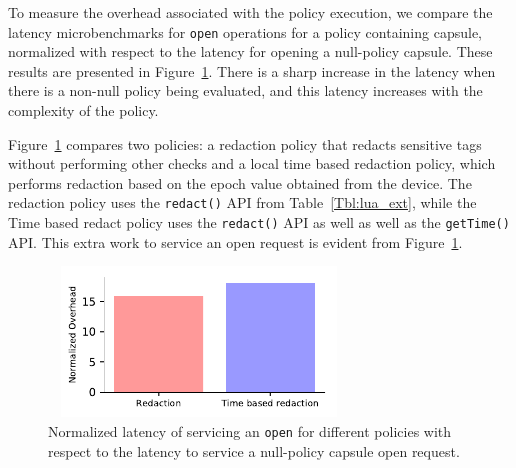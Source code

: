 To measure the overhead associated with the policy execution, we
compare the latency microbenchmarks for \texttt{open} operations for a
policy containing capsule, normalized with respect to the latency for
opening a null-policy capsule. These results are presented in
Figure~\ref{fig:policy_latency}. There is a sharp increase in the
latency when there is a non-null policy being evaluated, and this
latency increases with the complexity of the policy.

Figure~\ref{fig:policy_latency} compares two policies: a redaction
policy that redacts sensitive tags without performing other checks and
a local time based redaction policy, which performs redaction based on
the epoch value obtained from the device. The redaction policy uses
the \texttt{redact()} API from Table~\ref{Tbl:lua_ext}, while the Time
based redact policy uses the \texttt{redact()} API as well as well as
the \texttt{getTime()} API. This extra work to service an open request
is evident from Figure~\ref{fig:policy_latency}.

\begin{figure}[t]
    \centering
    \includegraphics[width=8cm,height=4cm]{fig/policy_latencies.pdf}
    \caption{Normalized latency of servicing an \texttt{open} for different policies with respect to the latency to service a null-policy capsule open request. }
    \label{fig:policy_latency}
\end{figure}




